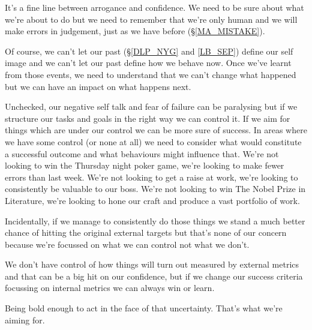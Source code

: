\cleardoublepage
{\small

It's a fine line between arrogance and confidence. We need to be sure about what we're about to do but we need to remember that we're only human and we will make errors in judgement, just as we have before (\S \ref{MA_MISTAKE}). 

Of course, we can't let our past (\S \ref{DLP_NYG} and \ref{LB_SEP}) define our self image and we can't let our past define how we behave now. Once we've learnt from those events, we need to understand that we can't change what happened but we can have an impact on what happens next.

Unchecked, our negative self talk and fear of failure can be paralysing but if we structure our tasks and goals in the right way we can control it. If we aim for things which are under our control we can be more sure of success. In areas where we have some control (or none at all) we need to consider what would constitute a successful outcome and what behaviours might influence that. We're not looking to win the Thursday night poker game, we're looking to make fewer errors than last week. We're not looking to get a raise at work, we're looking to consistently be valuable to our boss. We're not looking to win The Nobel Prize in Literature, we're looking to hone our craft and produce a vast portfolio of work.

Incidentally, if we manage to consistently do those things we stand a much better chance of hitting the original external targets but that's none of our concern because we're focussed on what we can control not what we don't.

We don't have control of how things will turn out measured by external metrics and that can be a big hit on our confidence, but if we change our success criteria focussing on internal metrics we can always win or learn. 

Being bold enough to act in the face of that uncertainty. That's what we're aiming for.
}


